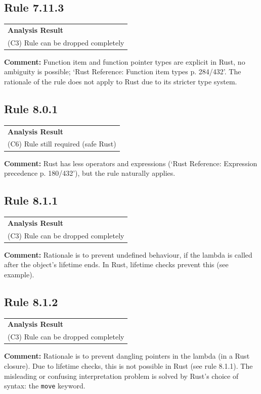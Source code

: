 \subsection*{Rule 7.11.3}
\begin{longtable}{p{13cm}}
\textbf{Analysis Result} \\
(C3) Rule can be dropped completely \\
\end{longtable}
\textbf{Comment:} Function item and function pointer types are explicit in Rust, no ambiguity is possible; `Rust Reference: Function item types p. 284/432'. The rationale of the rule does not apply to Rust due to its stricter type system. \\
\subsection*{Rule 8.0.1}
\begin{longtable}{p{13cm}}
\textbf{Analysis Result} \\
(C6) Rule still required (safe Rust) \\
\end{longtable}
\textbf{Comment:} Rust has less operators and expressions (`Rust Reference: Expression precedence p. 180/432'), but the rule naturally applies. \\
\subsection*{Rule 8.1.1}
\begin{longtable}{p{13cm}}
\textbf{Analysis Result} \\
(C3) Rule can be dropped completely \\
\end{longtable}
\textbf{Comment:} Rationale is to prevent undefined behaviour, if the lambda is called after the object's lifetime ends. In Rust, lifetime checks prevent this (see example). \\


\subsection*{Rule 8.1.2}
\begin{longtable}{p{13cm}}
\textbf{Analysis Result} \\
(C3) Rule can be dropped completely \\
\end{longtable}
\textbf{Comment:} Rationale is to prevent dangling pointers in the lambda (in a Rust closure). Due to lifetime checks, this is not possible in Rust (see rule 8.1.1). The misleading or confusing interpretation problem is solved by Rust's choice of syntax: the \texttt{move} keyword. \\

